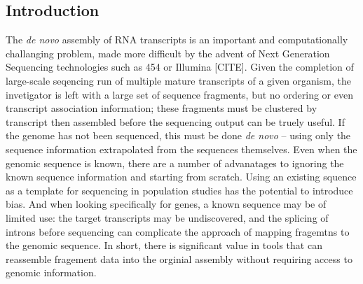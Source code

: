 \documentclass[10pt]{bmc_article}
\newenvironment{bmcformat}{\begin{raggedright}\baselineskip20pt\sloppy\setboolean{publ}{false}}{\end{raggedright}\baselineskip20pt\sloppy}
\begin{document}
\begin{bmcformat}
\begin{abstract}
\end{abstract}











\section*{Introduction}
The {\it de novo} assembly of RNA transcripts is an important and
computationally challanging problem, made more difficult by the advent
of Next Generation Sequencing technologies such as 454 or Illumina
[CITE].  Given the completion of large-scale seqencing run of multiple
mature transcripts of a given organism, the invetigator is left with a
large set of sequence fragments, but no ordering or even transcript
association information; these fragments must be clustered by
transcript then assembled before the sequencing output can be truely
useful.  If the genome has not been sequenced, this must be done {\it
  de novo} -- using only the sequence information extrapolated from
the sequences themselves.  Even when the genomic sequence is known,
there are a number of advanatages to ignoring the known sequence
information and starting from scratch.  Using an existing squence as a
template for sequencing in population studies has the potential to
introduce bias.  And when looking specifically for genes, a known
sequence may be of limited use: the target transcripts may be
undiscovered, and the splicing of introns before sequencing can complicate
the approach of mapping fragemtns to the genomic sequence.  In short,
there is significant value in tools that can reassemble fragement data
into the orginial assembly without requiring access to genomic
information.


\end{bmcformat}
\end{document}
